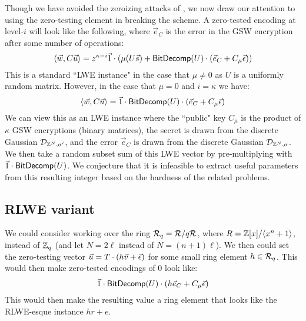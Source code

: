 Though we have avoided the zeroizing attacks of \cite{chl, cgh}, we now draw our attention to using the zero-testing element in breaking the scheme.  A zero-tested encoding at level-$i$ will look like the following, where $\vec{e}_C$ is the error in the GSW encryption after some number of operations:
$$\left<\vec{w}, C \vec{u}\right> = z^{\kappa-i}\vec{1}\cdot(\mu(U \vec{s}) + \mathsf{BitDecomp}(U)\cdot (\vec{e}_C + C_\mu\vec{\epsilon}))$$
This is a standard ``LWE instance" in the case that $\mu \not= 0$ as $U$ is a uniformly random matrix.  However, in the case that $\mu = 0$ and $i = \kappa$ we have:
\begin{equation}\label{eq:topleveltested}
\left<\vec{w}, C \vec{u}\right> = \vec{1}\cdot \mathsf{BitDecomp}(U)\cdot (\vec{e}_C + C_\mu\vec{\epsilon})
\end{equation}
We can view this as an LWE instance where the ``public" key $C_\mu$ is the product of $\kappa$ GSW encryptions (binary matrices), the secret is drawn from the discrete Gaussian $\mathcal{D}_{\mathbb{Z}^N, \sigma'}$, and the error $\vec{e}_C$ is drawn from the discrete Gaussian $\mathcal{D}_{\mathbb{Z}^N, \sigma}$.  We then take a random subset sum of this LWE vector by pre-multiplying with $\vec{1}\cdot\mathsf{BitDecomp}(U)$.  We conjecture that it is infeasible to extract useful parameters from this resulting integer based on the hardness of the related problems.

\subsection{RLWE variant}
We could consider working over the ring $\mathcal{R}_q = \mathcal{R}/q\mathcal{R}$, where $R = \mathbb{Z}[x]/\langle x^n + 1 \rangle$, instead of $\mathbb{Z}_q$ (and let $N = 2\ell$ instead of $N = (n+1)\ell$).  We then could set the zero-testing vector $\vec{u} = T\cdot(h\vec{v} + \vec{\epsilon})$ for some small ring element $h \in \mathcal{R}_q$.  This would then make zero-tested encodings of $0$ look like:
$$\vec{1}\cdot \mathsf{BitDecomp}(U)\cdot (h\vec{e}_C + C_\mu\vec{\epsilon})$$
This would then make the resulting value a ring element that looks like the RLWE-esque instance $hr + e$.

